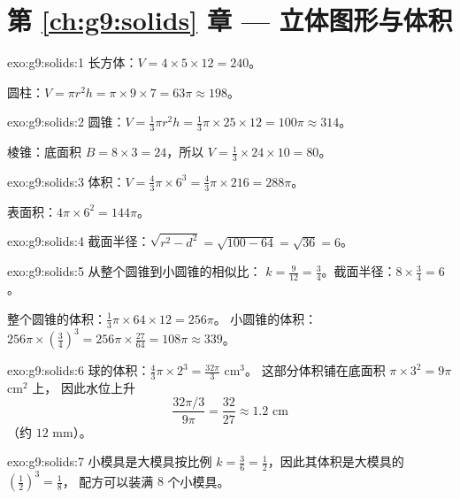 \section*{第 \ref{ch:g9:solids} 章 --- 立体图形与体积}

\begin{solution}{exo:g9:solids:1}
长方体：$V = 4 \times 5 \times 12 = 240$。

圆柱：$V = \pi r^2 h = \pi \times 9 \times 7 = 63\pi \approx 198$。
\end{solution}

\begin{solution}{exo:g9:solids:2}
圆锥：$V = \frac13 \pi r^2 h = \frac13 \pi \times 25 \times 12 =
100\pi \approx 314$。

棱锥：底面积 $B = 8 \times 3 = 24$，所以
$V = \frac13 \times 24 \times 10 = 80$。
\end{solution}

\begin{solution}{exo:g9:solids:3}
体积：$V = \frac43 \pi \times 6^3 = \frac43 \pi \times 216 = 288\pi$。

表面积：$4\pi \times 6^2 = 144\pi$。
\end{solution}

\begin{solution}{exo:g9:solids:4}
截面半径：$\sqrt{r^2 - d^2} = \sqrt{100 - 64} = \sqrt{36}
= 6$。
\end{solution}

\begin{solution}{exo:g9:solids:5}
从整个圆锥到小圆锥的相似比：
$k = \frac{9}{12} = \frac34$。截面半径：$8 \times \frac34 = 6$。

整个圆锥的体积：$\frac13\pi \times 64 \times 12 = 256\pi$。
小圆锥的体积：$256\pi \times \left(\frac34\right)^3 =
256\pi \times \frac{27}{64} = 108\pi \approx 339$。
\end{solution}

\begin{solution}{exo:g9:solids:6}
球的体积：$\frac43\pi \times 2^3 = \frac{32\pi}{3}$ cm$^3$。
这部分体积铺在底面积 $\pi \times 3^2 = 9\pi$ cm$^2$ 上，
因此水位上升
\[
\frac{32\pi/3}{9\pi} = \frac{32}{27} \approx 1.2 \text{ cm}
\]
（约 $12$ mm）。
\end{solution}

\begin{solution}{exo:g9:solids:7}
小模具是大模具按比例 $k = \frac36 =
\frac12$，因此其体积是大模具的 $\left(\frac12\right)^3 = \frac18$，
配方可以装满 $8$ 个小模具。
\end{solution}


